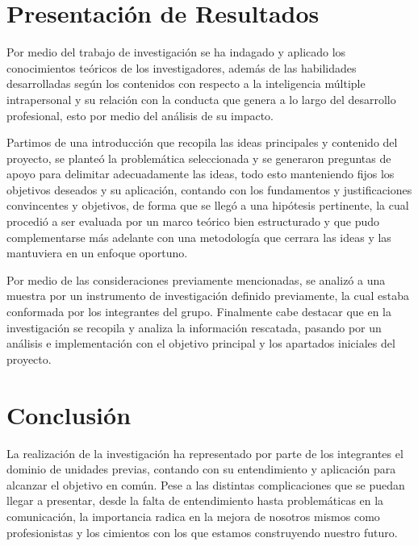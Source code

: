 \section{Presentación de Resultados}

Por medio del trabajo de investigación se ha indagado y aplicado los conocimientos teóricos de los investigadores, además de las habilidades desarrolladas según los contenidos con respecto a la inteligencia múltiple intrapersonal y su relación con la conducta que genera a lo largo del desarrollo profesional, esto por medio del análisis de su impacto. 

Partimos de una introducción que recopila las ideas principales y contenido del proyecto, se planteó la problemática seleccionada y se generaron preguntas de apoyo para delimitar adecuadamente las ideas, todo esto manteniendo fijos los objetivos deseados y su aplicación, contando con los fundamentos y justificaciones convincentes y objetivos, de forma que se llegó a una hipótesis pertinente, la cual procedió a ser evaluada por un marco teórico bien estructurado y que pudo complementarse más adelante con una metodología que cerrara las ideas y las mantuviera en un enfoque oportuno. 

Por medio de las consideraciones previamente mencionadas, se analizó a una muestra por un instrumento de investigación definido previamente, la cual estaba conformada por los integrantes del grupo. Finalmente cabe destacar que en la investigación se recopila y analiza la información rescatada, pasando por un análisis e implementación con el objetivo principal y los apartados iniciales del proyecto. 

\section{Conclusión}

La realización de la investigación ha representado por parte de los integrantes el dominio de unidades previas, contando con su entendimiento y aplicación para alcanzar el objetivo en común. Pese a las distintas complicaciones que se puedan llegar a presentar, desde la falta de entendimiento hasta problemáticas en la comunicación, la importancia radica en la mejora de nosotros mismos como profesionistas y los cimientos con los que estamos construyendo nuestro futuro.
